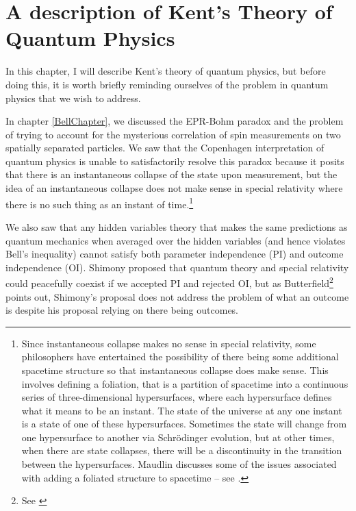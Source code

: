 \documentclass[12pt]{report}
\begin{document}
 
\newpage 
\chapter{A description of Kent's Theory of Quantum Physics\label{kentchapterdesc}}

In this chapter, I will describe Kent's theory of quantum physics, but before doing this, it is worth briefly reminding ourselves of the problem in quantum physics that we wish to address. 

In chapter \ref{BellChapter}, we discussed the EPR-Bohm paradox and the problem of trying to account for the mysterious correlation of spin measurements on two spatially separated particles. We saw that the Copenhagen interpretation of quantum physics is unable to satisfactorily resolve this paradox because it posits that there is an instantaneous collapse of the state upon measurement, but the idea of an instantaneous collapse does not make sense in special relativity where there is no such thing as an instant of time.\footnote{Since instantaneous collapse makes no sense in special relativity, some philosophers have entertained the possibility of there being some additional spacetime structure so that instantaneous collapse does make sense. This involves defining a foliation, that is a partition of spacetime into a continuous series of three-dimensional hypersurfaces, where each hypersurface defines what it means to be an instant. The state of the universe at any one instant is a state of one of these hypersurfaces. Sometimes the state will change from one hypersurface to another via Schr\"{o}dinger evolution, but at other times, when there are state collapses, there will be a discontinuity in the transition between the hypersurfaces. Maudlin discusses some of the issues associated with adding a foliated structure to spacetime -- see \cite{Maudlin3}.} 

We also saw that any hidden variables theory that makes the same predictions as quantum mechanics when averaged over the hidden variables (and hence violates Bell's inequality) cannot satisfy both  parameter independence (PI) and outcome independence (OI). Shimony proposed that quantum theory and special relativity could peacefully coexist if we accepted PI and rejected OI, but as Butterfield\footnote{See \cite{Butterfield}} points out, Shimony's proposal  does not address the problem of what an outcome is despite his proposal relying on there being outcomes. 
\end{document}

